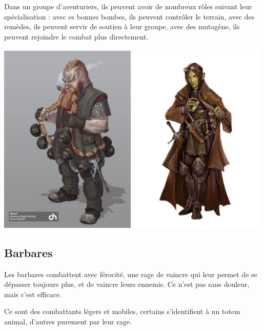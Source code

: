 \documentclass[10pt,a4paper]{book}
\begin{document}
Dans un groupe d'aventuriers, ils peuvent avoir de nombreux rôles suivant leur spécialisation : avec es bonnes bombes, ils peuvent contrôler le terrain, avec des remèdes, ils peuvent servir de soutien à leur groupe, avec des mutagène, ils peuvent rejoindre le combat plus directement.

\includegraphics[width=0.49\textwidth]{alchimiste 1}
\includegraphics[width=0.49\textwidth]{alchimiste 2}
\subsection{Barbares}
Les barbares combattent avec férocité, une rage de vaincre qui leur permet de se dépasser toujours plus, et de vaincre leurs ennemis. Ce n'est pas sans douleur, mais c'est efficace.

Ce sont des combattants légers et mobiles, certains s'identifient à un totem animal, d'autres purement par leur rage.
\end{document}
